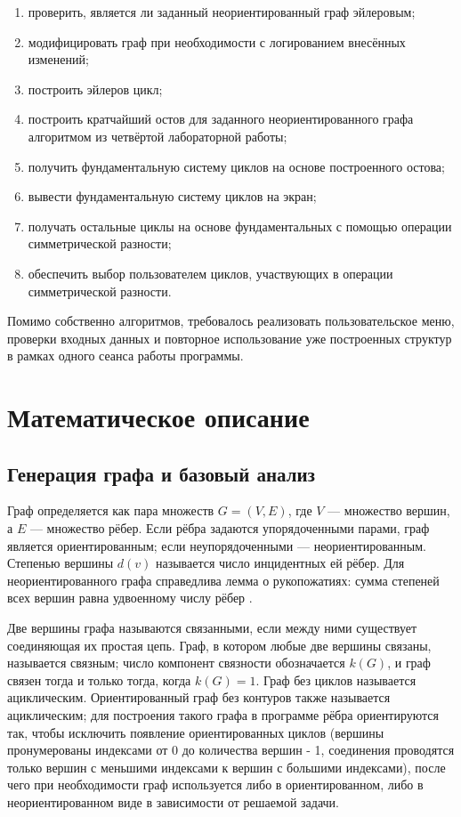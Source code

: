 \documentclass[14pt,a4paper]{extarticle}
\begin{document}
\begin{enumerate}[start=30]
    \item проверить, является ли заданный неориентированный граф эйлеровым;
    \item модифицировать граф при необходимости с логированием внесённых изменений;
    \item построить эйлеров цикл;
    \item построить кратчайший остов для заданного неориентированного графа алгоритмом из четвёртой лабораторной работы;
    \item получить фундаментальную систему циклов на основе построенного остова;
    \item вывести фундаментальную систему циклов на экран;
    \item получать остальные циклы на основе фундаментальных с помощью операции симметрической разности;
    \item обеспечить выбор пользователем циклов, участвующих в операции симметрической разности.
\end{enumerate}

Помимо собственно алгоритмов, требовалось реализовать пользовательское меню, проверки входных данных и повторное использование уже построенных структур в рамках одного сеанса работы программы.

\newpage
\section{Математическое описание}

\subsection{Генерация графа и базовый анализ}

Граф определяется как пара множеств \(G=(V,E)\), где \(V\) --- множество вершин, а \(E\) --- множество рёбер. Если рёбра задаются упорядоченными парами, граф является ориентированным; если неупорядоченными --- неориентированным. Степенью вершины \(d(v)\) называется число инцидентных ей рёбер. Для неориентированного графа справедлива лемма о рукопожатиях: сумма степеней всех вершин равна удвоенному числу рёбер \cite{haggarty}.

Две вершины графа называются связанными, если между ними существует соединяющая их простая цепь. Граф, в котором любые две вершины связаны, называется связным; число компонент связности обозначается \(k(G)\), и граф связен тогда и только тогда, когда \(k(G)=1\). Граф без циклов называется ациклическим. Ориентированный граф без контуров также называется ациклическим; для построения такого графа в программе рёбра ориентируются так, чтобы исключить появление ориентированных циклов (вершины пронумерованы индексами от 0 до количества вершин - 1, соединения проводятся только вершин с меньшими индексами к вершин с большими индексами), после чего при необходимости граф используется либо в ориентированном, либо в неориентированном виде в зависимости от решаемой задачи.
\end{document}
